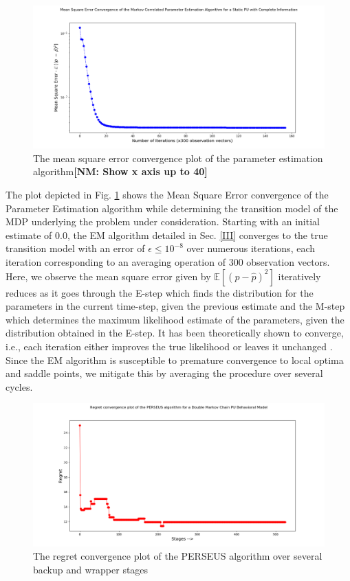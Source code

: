 \documentclass[10pt,twocolumn]{IEEEtran}
\newcommand{\nm}[1]{{\color{blue}\bf{[NM: #1]}}}
\begin{document}
\begin{figure}
    \centering
    \includegraphics[scale=0.25]{Mean_Square_Plot_Log_Scale.png}
    \caption{The mean square error convergence plot of the parameter estimation algorithm\nm{Show x axis up to 40}}
    \label{fig:4}
\end{figure}
The plot depicted in Fig. \ref{fig:4} shows the Mean Square Error convergence of the Parameter Estimation algorithm while determining the transition model of the MDP underlying the problem under consideration. Starting with an initial estimate of 0.0, the EM algorithm detailed in Sec. \ref{III} converges to the true transition model  with an error of $\epsilon \leq 10^{-8}$ over numerous iterations, each iteration corresponding to an averaging operation of 300 observation vectors. Here, we observe the mean square error given by $\mathbb{E}[(p - \hat{p})^{2}]$ iteratively reduces as it goes through the E-step which finds the distribution for the parameters in the current time-step, given the previous estimate and the M-step which determines the maximum likelihood estimate of the parameters, given the distribution obtained in the E-step. It has been theoretically shown to converge, i.e., each iteration either improves the true likelihood or leaves it unchanged \cite{Neal1998}. Since the EM algorithm is susceptible to premature convergence to local optima and saddle points, we mitigate this by averaging the procedure over several cycles.
\begin{figure}
    \centering
    \includegraphics[scale=0.25]{Regret_Convergence_Plot_04112019.png}
    \caption{The regret convergence plot of the PERSEUS algorithm over several backup and wrapper stages}
    \label{fig:5}
\end{figure}
\end{document}
